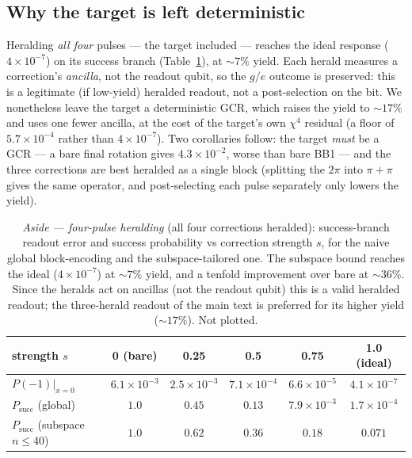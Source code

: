 \documentclass[11pt]{article}
\begin{document}
\subsection{Why the target is left deterministic}
Heralding \emph{all four} pulses --- the target included --- reaches the ideal response
($4\times10^{-7}$) on its success branch (Table~\ref{tab:herald}), at $\sim7\%$ yield. Each herald
measures a correction's \emph{ancilla}, not the readout qubit, so the $g/e$ outcome is preserved: this
is a legitimate (if low-yield) heralded readout, not a post-selection on the bit. We nonetheless leave
the target a deterministic GCR, which raises the yield to $\sim17\%$ and uses one fewer ancilla, at
the cost of the target's own $\chi^4$ residual (a floor of $5.7\times10^{-4}$ rather than
$4\times10^{-7}$). Two corollaries follow: the target \emph{must} be a GCR --- a bare final rotation
gives $4.3\times10^{-2}$, worse than bare BB1 --- and the three corrections are best heralded as a
single block (splitting the $2\pi$ into $\pi+\pi$ gives the same operator, and post-selecting each
pulse separately only lowers the yield).

\begin{table}[h]
\centering
\begin{tabular}{lccccc}
\toprule
strength $s$ & 0 (bare) & 0.25 & 0.5 & 0.75 & 1.0 (ideal) \\
\midrule
$P(-1)|_{x=0}$ & $6.1\times10^{-3}$ & $2.5\times10^{-3}$ & $7.1\times10^{-4}$ & $6.6\times10^{-5}$ & $4.1\times10^{-7}$ \\
$P_{\mathrm{succ}}$ (global) & $1.0$ & $0.45$ & $0.13$ & $7.9\times10^{-3}$ & $1.7\times10^{-4}$ \\
$P_{\mathrm{succ}}$ (subspace $n\le40$) & $1.0$ & $0.62$ & $\mathbf{0.36}$ & $0.18$ & $\mathbf{0.071}$ \\
\bottomrule
\end{tabular}
\caption{\emph{Aside --- four-pulse heralding} (all four corrections heralded): success-branch readout
error and success probability vs correction strength $s$, for the naive global block-encoding and the
subspace-tailored one. The subspace bound reaches the ideal ($4\times10^{-7}$) at $\sim7\%$ yield, and
a tenfold improvement over bare at $\sim36\%$. Since the heralds act on ancillas (not the readout
qubit) this is a valid heralded readout; the three-herald readout of the main text is preferred for
its higher yield ($\sim17\%$). Not plotted.}
\label{tab:herald}
\end{table}
\end{document}
